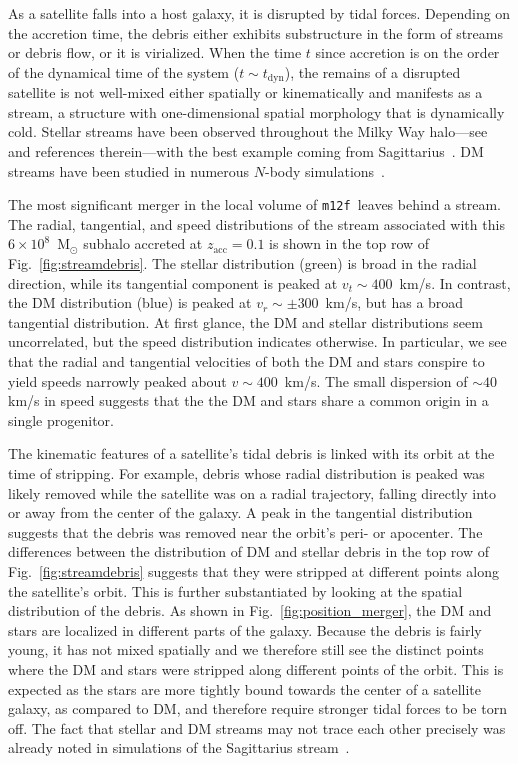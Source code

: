 \documentclass[twocolumn,preprintnumbers]{aastex6}
\DeclareRobustCommand{\Fig}[1]{Fig.~\ref{#1}}
\newcommand{\zacc}{z_\mathrm{acc}}
\newcommand{\mf}{\texttt{m12f}}
\begin{document}
As a satellite falls into a host galaxy, it is disrupted by tidal forces.  Depending on the accretion time, the debris either exhibits substructure in the form of streams or debris flow, or it is virialized.  When the time $t$ since accretion is on the order of the dynamical time of the system ($t\sim t_\mathrm{dyn}$),  the remains of a disrupted satellite is not well-mixed either spatially or kinematically and manifests as a stream, a structure with one-dimensional spatial morphology that is dynamically cold.   Stellar streams have been observed throughout the Milky Way halo---see~\cite{2016ASSL..420...87G} and references therein---with the best example coming from Sagittarius~\citep{Ivezic:2000ua, Yanny:2000ty}.  DM streams have been studied in numerous $N$-body simulations~\citep{Zemp:2008gw, Vogelsberger:2008qb, Diemand:2008in,Kuhlen:2009vh,Maciejewski:2010gz,2011MNRAS.413.1419V, Elahi:2011dy}. 

The most significant merger in the local volume of \mf~leaves behind a stream.  The radial, tangential, and speed distributions of the stream associated with this $6\times10^8$~M$_\odot$ subhalo accreted at $\zacc = 0.1$ is shown in the top row of \Fig{fig:streamdebris}.  The stellar distribution (green) is broad in the radial direction, while its tangential component is peaked at $v_t \sim 400$~km/s.  In contrast, the DM distribution (blue) is peaked at $v_r \sim \pm 300$~km/s, but has a broad tangential distribution.  At first glance, the DM and stellar distributions seem  uncorrelated, but the speed distribution indicates otherwise.  In particular, we see that the radial and tangential velocities of both the DM and stars conspire to yield speeds narrowly peaked about $v \sim 400$~km/s.  The small dispersion of $\sim 40$ km/s in speed suggests that the the DM and stars share a common origin in a single progenitor. 

The kinematic features of a satellite's tidal debris is linked with its orbit at the time of stripping.  For example, debris whose radial distribution is peaked was likely removed while the satellite was on a radial trajectory, falling directly into or away from the center of the galaxy.  A peak in the tangential distribution suggests that the debris was removed near the orbit's peri- or apocenter.  The differences between the distribution of DM and stellar debris in the top row of \Fig{fig:streamdebris} suggests that they were stripped at different points along the satellite's orbit.
This is further substantiated by looking at the spatial distribution of the debris.  As shown in \Fig{fig:position_merger}, the DM and stars are localized in different parts of the galaxy.  Because the debris is fairly young, it has not mixed spatially and we therefore still see the distinct points where the DM and stars were stripped along different points of the orbit.  This is expected as the stars are more tightly bound towards the center of a satellite galaxy, as compared to DM, and therefore require stronger tidal forces to be torn off.  
The fact that stellar and DM streams may not trace each other precisely was already noted in simulations of the Sagittarius stream~\citep{2012JCAP...08..027P}. 
\end{document}
